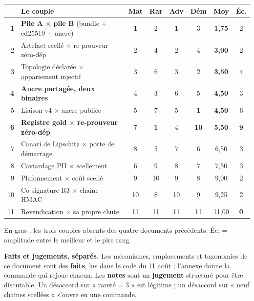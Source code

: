 \documentclass[10pt]{article}
\newcommand{\best}[1]{{\color{green}\textbf{#1}}}
\newcommand{\pire}[1]{{\color{red}\textbf{#1}}}
\newcommand{\sz}[1]{{\small\color{grey}\textsf{#1}}}
\newcommand{\x}{$\times$}
\begin{document}
\renewcommand{\arraystretch}{1.13}
\begin{center}\small
\begin{tabular}{@{}r >{\raggedright\arraybackslash}p{7.1cm} cccc c c@{}}
\toprule
& \textbf{Le couple} & \sz{Mat} & \sz{Rar} & \sz{Adv} & \sz{Dém} & \textbf{Moy} & \sz{Éc.} \\
\midrule
\textbf{1} & \textbf{Pile A \x{} pile B} \sz{(bundle + ed25519 + ancre)} & \best{1} & 2 & \best{1} & 3 & \textbf{1,75} & 2 \\
2 & Artefact scellé \x{} re-prouveur zéro-dép & 2 & 4 & 2 & 4 & \textbf{3,00} & 2 \\
3 & Topologie déclarée \x{} appariement injectif & 3 & 6 & 3 & 2 & \textbf{3,50} & 4 \\
\textbf{4} & \textbf{Ancre partagée, deux binaires} & 4 & 3 & 6 & 5 & \textbf{4,50} & 3 \\
5 & Liaison v4 \x{} ancre publiée & 5 & 7 & 5 & \best{1} & \textbf{4,50} & 6 \\
\textbf{6} & \textbf{Registre gold \x{} re-prouveur zéro-dép} & 7 & \best{1} & 4 & \pire{10} & \textbf{5,50} & \pire{9} \\
7 & Canari de Lipschitz \x{} porte de démarrage & 8 & 5 & 7 & 6 & 6,50 & 3 \\
8 & Caviardage PII \x{} scellement & 6 & 9 & 8 & 7 & 7,50 & 3 \\
9 & Plafonnement \x{} coût scellé & 9 & 10 & 9 & 8 & 9,00 & 2 \\
10 & Co-signature R3 \x{} chaîne HMAC & 10 & 8 & 10 & 9 & 9,25 & 2 \\
11 & Revendication \x{} sa propre chute & 11 & 11 & 11 & 11 & 11,00 & \best{0} \\
\bottomrule
\end{tabular}
\end{center}

\sz{En gras : les trois couples absents des quatre documents précédents. Éc. = amplitude entre le
meilleur et le pire rang.}

\begin{alerte}
\textbf{Faits et jugements, séparés.} Les mécanismes, emplacements et taxonomies de ce document sont des
\textbf{faits}, lus dans le code du 11 août ; l'annexe donne la commande qui rejoue chacun. Les
\textbf{notes} sont un \textbf{jugement} structuré pour être discutable. Un désaccord sur « rareté = 3 »
est légitime ; un désaccord sur « neuf chaînes scellées » s'ouvre en une commande.
\end{alerte}
\end{document}
